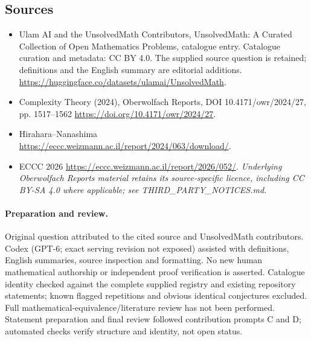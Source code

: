 \documentclass[11pt]{article}
\begin{document}
\subsection{Sources}
\begin{itemize}
\item[\hypertarget{source:statement:1}{S1}] Ulam AI and the UnsolvedMath Contributors, UnsolvedMath: A Curated Collection of Open Mathematics Problems, catalogue entry. Catalogue curation and metadata: CC BY 4.0. The supplied source question is retained; definitions and the English summary are editorial additions.
\url{https://huggingface.co/datasets/ulamai/UnsolvedMath}.
\item[\hypertarget{source:statement:2}{S2}] Complexity Theory (2024), Oberwolfach Reports, DOI 10.4171/owr/2024/27, pp. 1517--1562
\url{https://doi.org/10.4171/owr/2024/27}.
\item[\hypertarget{source:statement:3}{S3}] Hirahara--Nanashima
\url{https://eccc.weizmann.ac.il/report/2024/063/download/}.
\item[\hypertarget{source:statement:4}{S4}] ECCC 2026
\url{https://eccc.weizmann.ac.il/report/2026/052/}.
\textit{Underlying Oberwolfach Reports material retains its source-specific licence, including CC BY-SA 4.0 where applicable; see THIRD\_PARTY\_NOTICES.md.}
\end{itemize}
\paragraph{Preparation and review.}
Original question attributed to the cited source and UnsolvedMath contributors. Codex (GPT-6; exact serving revision not exposed) assisted with definitions, English summaries, source inspection and formatting. No new human mathematical authorship or independent proof verification is asserted. Catalogue identity checked against the complete supplied registry and existing repository statements; known flagged repetitions and obvious identical conjectures excluded. Full mathematical-equivalence/literature review has not been performed. Statement preparation and final review followed contribution prompts C and D; automated checks verify structure and identity, not open status.
\label{end:statement}
\end{document}

